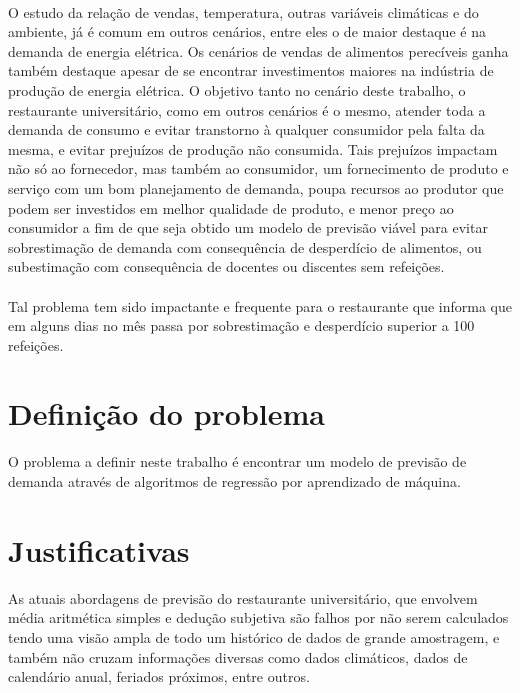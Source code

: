 \documentclass[	12pt, Times, openright, twoside, a4paper, english, brazil]{abntex2}
\begin{document}
        \paragraph*{} O estudo da relação de vendas, temperatura, outras variáveis climáticas e do ambiente, já é comum em outros cenários, entre eles o de maior destaque é na demanda de energia elétrica. Os cenários de vendas de alimentos perecíveis ganha também destaque apesar de se encontrar investimentos maiores na indústria de produção de energia elétrica. O objetivo tanto no cenário deste trabalho, o restaurante universitário, como em outros cenários é o mesmo, atender toda a demanda de consumo e evitar transtorno à qualquer consumidor pela falta da mesma, e evitar prejuízos de produção não consumida. Tais prejuízos impactam não só ao fornecedor, mas também ao consumidor, um fornecimento de produto e serviço com um bom planejamento de demanda, poupa recursos ao produtor que podem ser investidos em melhor qualidade de produto, e menor preço ao consumidor a fim de que seja obtido um modelo de previsão viável para evitar sobrestimação de demanda com consequência de desperdício de alimentos, ou subestimação com consequência de docentes ou discentes sem refeições. 

        \paragraph*{} Tal problema tem sido impactante e frequente para o restaurante que informa que em alguns
        dias no mês passa por sobrestimação e desperdício superior a 100 refeições. 

      \section{Definição do problema}
        O problema a definir neste trabalho é encontrar um modelo de previsão de demanda através de algoritmos de regressão por aprendizado de máquina.

      \section{Justificativas}
        As atuais abordagens de previsão do restaurante universitário, que envolvem média aritmética simples e dedução subjetiva são falhos por não serem calculados tendo uma visão ampla de todo um histórico de dados de grande amostragem, e também não cruzam informações diversas como dados climáticos, dados de calendário anual, feriados próximos, entre outros.
\end{document}
